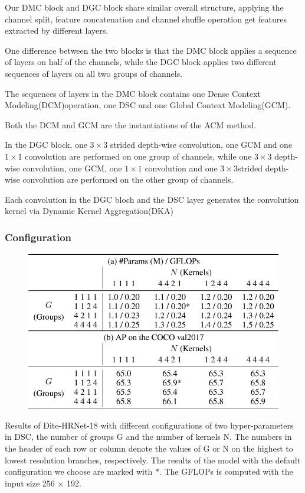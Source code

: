 \documentclass[11pt]{article}
\begin{document}
Our DMC block and DGC block share similar overall structure, applying the channel split, feature concatenation and channel shuffle operation get features extracted by different layers.

One difference between the two blocks is that the DMC block applies a sequence of layers on half of the channels, while the DGC block applies two different sequences of layers on all two groups of channels.

The sequences of layers in the DMC block contains one Dense Context Modeling(DCM)operation, one DSC and one Global Context Modeling(GCM).

Both the DCM and GCM are the instantiations of the ACM method.

In the DGC block, one $3\times 3$ strided depth-wise convolution, one GCM and one $1\times 1$ convolution are performed on one group of channels, while one $3\times 3$ depth-wise convolution, one GCM, one $1\times 1$ convolution and one $3\times 3$strided depth-wise convolution are performed on the other group of channels.

Each convolution in the DGC bloch and the DSC layer generates the convolution kernel via Dynamic Kernel Aggregation(DKA)

\subsubsection{Configuration}
\begin{figure}[H]
	\centering
	\includegraphics[scale=0.5]{97}
\end{figure}

Results of Dite-HRNet-18 with different configurations of two hyper-parameters in DSC, the number of groups G and the number of kernels N. The numbers in the header of each row or column denote the values of G or N on the highest to lowest resolution branches, respectively. The results of the model with the default configuration we choose are marked with $*$. The GFLOPs is computed with the input size 256 × 192.
\end{document}
